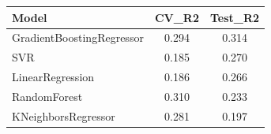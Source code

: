 \begin{tabular}{|l|c|c|}
\toprule
Model & CV\_R2 & Test\_R2 \\
\midrule
GradientBoostingRegressor & 0.294 & 0.314 \\
SVR & 0.185 & 0.270 \\
LinearRegression & 0.186 & 0.266 \\
RandomForest & 0.310 & 0.233 \\
KNeighborsRegressor & 0.281 & 0.197 \\
\bottomrule
\end{tabular}
